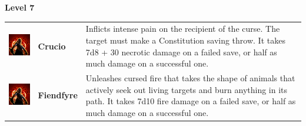 \textbf{Level 7} 
\begin{tabular}{ m{4cm}m{3cm}m{6cm} } 
	\includegraphics[width=4cm]{../Pictures/Gameplay/Spells/Icon/spell_icon.png} & \textbf{Crucio} & Inflicts intense pain on the recipient of the curse. The target must make a Constitution saving throw. It takes 7d8 + 30 necrotic damage on a failed save, or half as much damage on a successful one.\\ 
	\includegraphics[width=4cm]{../Pictures/Gameplay/Spells/Icon/spell_icon.png} & \textbf{Fiendfyre} & Unleashes cursed fire that takes the shape of animals that actively seek out living targets and burn anything in its path. It takes 7d10 fire damage on a failed save, or half as much damage on a successful one.  \\ 
\end{tabular}

